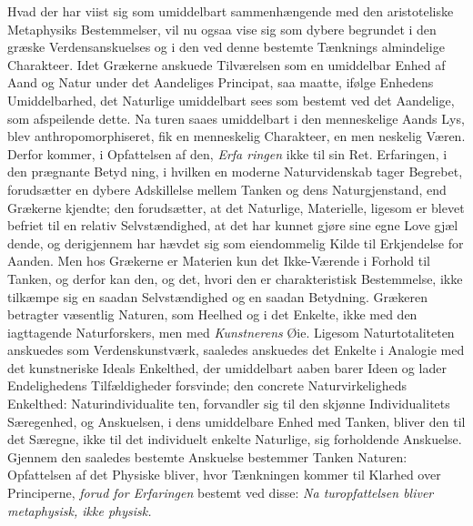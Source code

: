 \documentclass[12pt,a4paper]{book}
\begin{document}
Hvad der har viist sig som umiddelbart sammenhængende
med den aristoteliske Metaphysiks Bestemmelser, vil nu ogsaa
vise sig som dybere begrundet i den græske Verdensanskuelses
og i den ved denne bestemte Tænknings almindelige Charakteer.
Idet Grækerne anskuede Tilværelsen som en umiddelbar Enhed
af Aand og Natur under det Aandeliges Principat, saa maatte,
ifølge Enhedens Umiddelbarhed, det Naturlige umiddelbart sees
som bestemt ved det Aandelige, som afspeilende dette. Na\-%
turen saaes umiddelbart i den menneskelige Aands Lys, blev
anthropomorphiseret, fik en menneskelig Charakteer, en men\-%
neskelig Væren. Derfor kommer, i Opfattelsen af den, \emph{Erfa\-%
ringen} ikke til sin Ret. Erfaringen, i den prægnante Betyd\-%
ning, i hvilken en moderne Naturvidenskab tager Begrebet,
forudsætter en dybere Adskillelse mellem Tanken og dens
Naturgjenstand, end Grækerne kjendte; den forudsætter, at det
Naturlige, Materielle, ligesom er blevet befriet til en relativ
Selvstændighed, at det har kunnet gjøre sine egne Love gjæl\-%
dende, og derigjennem har hævdet sig som eiendommelig Kilde
til Erkjendelse for Aanden. Men hos Grækerne er Materien
kun det Ikke-Værende i Forhold til Tanken, og derfor kan
den, og det, hvori den er charakteristisk Bestemmelse, ikke
tilkæmpe sig en saadan Selvstændighed og en saadan Betydning.
Grækeren betragter væsentlig Naturen, som Heelhed og i det
Enkelte, ikke med den iagttagende Naturforskers, men med
\emph{Kunstnerens} Øie. Ligesom Naturtotaliteten anskuedes som
Verdenskunstværk, saaledes anskuedes det Enkelte i Analogie
med det kunstneriske Ideals Enkelthed, der umiddelbart aaben\-%
barer Ideen og lader Endelighedens Tilfældigheder forsvinde;
den concrete Naturvirkeligheds Enkelthed: Naturindividualite\-%
ten, forvandler sig til den skjønne Individualitets Særegenhed,
og Anskuelsen, i dens umiddelbare Enhed med Tanken, bliver
den til det Særegne, ikke til det individuelt enkelte Naturlige,
sig forholdende Anskuelse. Gjennem den saaledes bestemte
Anskuelse bestemmer Tanken Naturen: Opfattelsen af det
Physiske bliver, hvor Tænkningen kommer til Klarhed over
Principerne, \emph{forud for Erfaringen} bestemt ved disse: \emph{Na\-%
turopfattelsen bliver metaphysisk, ikke physisk.}
\end{document}
